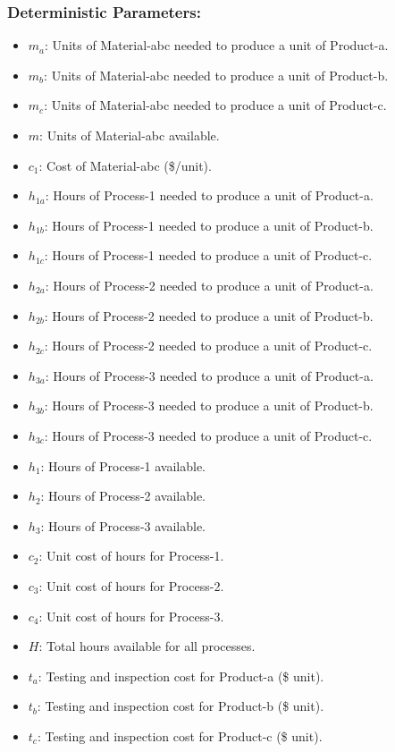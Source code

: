 \documentclass[7pt]{article}
\begin{document}
\subsubsection*{Deterministic Parameters:}
\vspace{-1.7em}
\begin{multicols}{2}
    \small
    \begin{itemize}[leftmargin=1.5em, labelsep=0.3em, noitemsep]
        \item $m_a$: Units of Material-abc needed to produce a unit of Product-a.
        \item $m_b$: Units of Material-abc needed to produce a unit of Product-b.
        \item $m_c$: Units of Material-abc needed to produce a unit of Product-c.
        \item $m$: Units of Material-abc available.
        \item $c_1$: Cost of Material-abc (\$/unit).
        \item $h_{1a}$: Hours of Process-1 needed to produce a unit of Product-a.
        \item $h_{1b}$: Hours of Process-1 needed to produce a unit of Product-b.
        \item $h_{1c}$: Hours of Process-1 needed to produce a unit of Product-c.
        \item $h_{2a}$: Hours of Process-2 needed to produce a unit of Product-a.
        \item $h_{2b}$: Hours of Process-2 needed to produce a unit of Product-b.
        \item $h_{2c}$: Hours of Process-2 needed to produce a unit of Product-c.
        \item $h_{3a}$: Hours of Process-3 needed to produce a unit of Product-a.
        \item $h_{3b}$: Hours of Process-3 needed to produce a unit of Product-b.
        \item $h_{3c}$: Hours of Process-3 needed to produce a unit of Product-c.
        \item $h_1$: Hours of Process-1 available.
        \item $h_2$: Hours of Process-2 available.
        \item $h_3$: Hours of Process-3 available.
        \item $c_2$: Unit cost of hours for Process-1.
        \item $c_3$: Unit cost of hours for Process-2.
        \item $c_4$: Unit cost of hours for Process-3.
        \item $H$: Total hours available for all processes.
        \item $t_a$: Testing and inspection cost for Product-a (\$ unit).
        \item $t_b$: Testing and inspection cost for Product-b (\$ unit).
        \item $t_c$: Testing and inspection cost for Product-c (\$ unit).
    \end{itemize}
\end{multicols}
\end{document}
